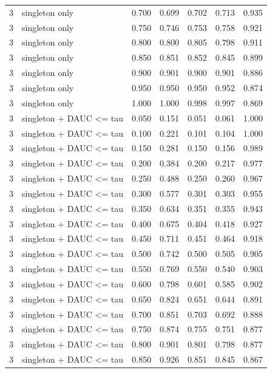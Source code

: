 \begin{tabular}{rlrrrrr}
3 & singleton only & 0.700 & 0.699 & 0.702 & 0.713 & 0.935 \\
3 & singleton only & 0.750 & 0.746 & 0.753 & 0.758 & 0.921 \\
3 & singleton only & 0.800 & 0.800 & 0.805 & 0.798 & 0.911 \\
3 & singleton only & 0.850 & 0.851 & 0.852 & 0.845 & 0.899 \\
3 & singleton only & 0.900 & 0.901 & 0.900 & 0.901 & 0.886 \\
3 & singleton only & 0.950 & 0.950 & 0.950 & 0.952 & 0.874 \\
3 & singleton only & 1.000 & 1.000 & 0.998 & 0.997 & 0.869 \\
3 & singleton + DAUC <= tau & 0.050 & 0.151 & 0.051 & 0.061 & 1.000 \\
3 & singleton + DAUC <= tau & 0.100 & 0.221 & 0.101 & 0.104 & 1.000 \\
3 & singleton + DAUC <= tau & 0.150 & 0.281 & 0.150 & 0.156 & 0.989 \\
3 & singleton + DAUC <= tau & 0.200 & 0.384 & 0.200 & 0.217 & 0.977 \\
3 & singleton + DAUC <= tau & 0.250 & 0.488 & 0.250 & 0.260 & 0.967 \\
3 & singleton + DAUC <= tau & 0.300 & 0.577 & 0.301 & 0.303 & 0.955 \\
3 & singleton + DAUC <= tau & 0.350 & 0.634 & 0.351 & 0.355 & 0.943 \\
3 & singleton + DAUC <= tau & 0.400 & 0.675 & 0.404 & 0.418 & 0.927 \\
3 & singleton + DAUC <= tau & 0.450 & 0.711 & 0.451 & 0.464 & 0.918 \\
3 & singleton + DAUC <= tau & 0.500 & 0.742 & 0.500 & 0.505 & 0.905 \\
3 & singleton + DAUC <= tau & 0.550 & 0.769 & 0.550 & 0.540 & 0.903 \\
3 & singleton + DAUC <= tau & 0.600 & 0.798 & 0.601 & 0.585 & 0.902 \\
3 & singleton + DAUC <= tau & 0.650 & 0.824 & 0.651 & 0.644 & 0.891 \\
3 & singleton + DAUC <= tau & 0.700 & 0.851 & 0.703 & 0.692 & 0.888 \\
3 & singleton + DAUC <= tau & 0.750 & 0.874 & 0.755 & 0.751 & 0.877 \\
3 & singleton + DAUC <= tau & 0.800 & 0.901 & 0.801 & 0.798 & 0.877 \\
3 & singleton + DAUC <= tau & 0.850 & 0.926 & 0.851 & 0.845 & 0.867 \\

\end{tabular}

